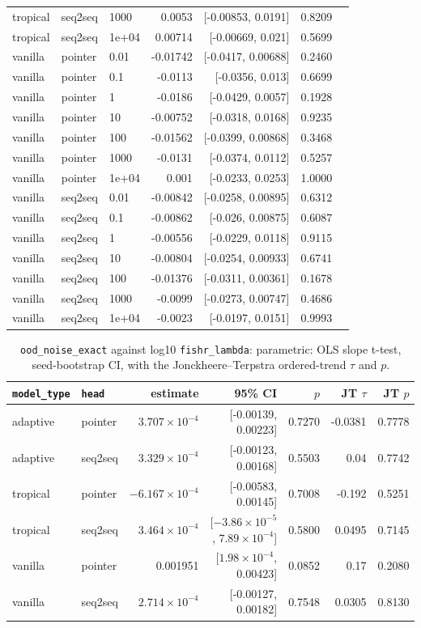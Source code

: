 \documentclass[10pt]{article}
\begin{document}
{\begin{longtable}{lllrrrl}
tropical & seq2seq & 1000 & 0.0053 & [-0.00853, 0.0191] & 0.8209 & \\
tropical & seq2seq & 1e+04 & 0.00714 & [-0.00669, 0.021] & 0.5699 & \\
vanilla & pointer & 0.01 & -0.01742 & [-0.0417, 0.00688] & 0.2460 & \\
vanilla & pointer & 0.1 & -0.0113 & [-0.0356, 0.013] & 0.6699 & \\
vanilla & pointer & 1 & -0.0186 & [-0.0429, 0.0057] & 0.1928 & \\
vanilla & pointer & 10 & -0.00752 & [-0.0318, 0.0168] & 0.9235 & \\
vanilla & pointer & 100 & -0.01562 & [-0.0399, 0.00868] & 0.3468 & \\
vanilla & pointer & 1000 & -0.0131 & [-0.0374, 0.0112] & 0.5257 & \\
vanilla & pointer & 1e+04 & 0.001 & [-0.0233, 0.0253] & 1.0000 & \\
vanilla & seq2seq & 0.01 & -0.00842 & [-0.0258, 0.00895] & 0.6312 & \\
vanilla & seq2seq & 0.1 & -0.00862 & [-0.026, 0.00875] & 0.6087 & \\
vanilla & seq2seq & 1 & -0.00556 & [-0.0229, 0.0118] & 0.9115 & \\
vanilla & seq2seq & 10 & -0.00804 & [-0.0254, 0.00933] & 0.6741 & \\
vanilla & seq2seq & 100 & -0.01376 & [-0.0311, 0.00361] & 0.1678 & \\
vanilla & seq2seq & 1000 & -0.0099 & [-0.0273, 0.00747] & 0.4686 & \\
vanilla & seq2seq & 1e+04 & -0.0023 & [-0.0197, 0.0151] & 0.9993 & \\
\bottomrule
\end{longtable}
}

{\small
\begin{longtable}{llrrrrr}
\caption{\texttt{ood\_noise\_exact} against log10 \texttt{fishr\_lambda}: parametric: OLS slope t-test, seed-bootstrap CI, with the Jonckheere--Terpstra ordered-trend $\tau$ and $p$.}\label{tab:trend-ood_noise_exact}\\
\toprule
\texttt{model\_type} & \texttt{head} & estimate & 95\% CI & $p$ & JT $\tau$ & JT $p$\\
\midrule
\endhead
adaptive & pointer & $3.707\times10^{-4}$ & [-0.00139, 0.00223] & 0.7270 & -0.0381 & 0.7778\\
adaptive & seq2seq & $3.329\times10^{-4}$ & [-0.00123, 0.00168] & 0.5503 & 0.04 & 0.7742\\
tropical & pointer & $-6.167\times10^{-4}$ & [-0.00583, 0.00145] & 0.7008 & -0.192 & 0.5251\\
tropical & seq2seq & $3.464\times10^{-4}$ & [$-3.86\times10^{-5}$, $7.89\times10^{-4}$] & 0.5800 & 0.0495 & 0.7145\\
vanilla & pointer & 0.001951 & [$1.98\times10^{-4}$, 0.00423] & 0.0852 & 0.17 & 0.2080\\
vanilla & seq2seq & $2.714\times10^{-4}$ & [-0.00127, 0.00182] & 0.7548 & 0.0305 & 0.8130\\
\bottomrule
\end{longtable}
}
\end{document}
